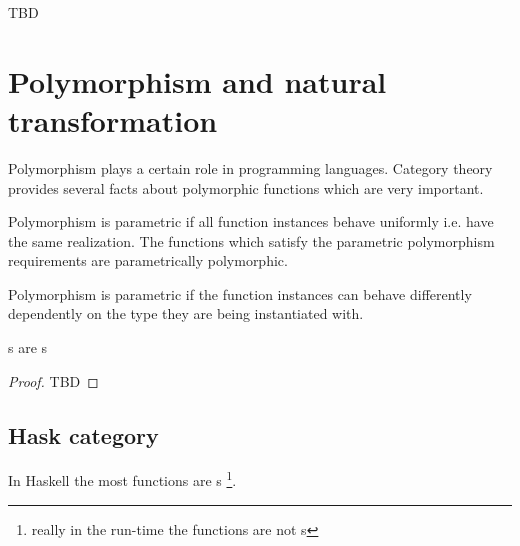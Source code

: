 TBD

\section{Polymorphism and natural transformation}

Polymorphism plays a certain role in programming languages. Category
theory provides several facts about polymorphic functions which are
very important.

\begin{definition}
\label{def:pp_function}
Polymorphism is parametric if all function instances behave uniformly
i.e. have the same realization. The functions which satisfy the
parametric polymorphism requirements are parametrically polymorphic.
\end{definition}

\begin{definition}
\label{def:ad_hoc_polymorphism}
Polymorphism is parametric if the function instances can behave
differently dependently on the type they are being instantiated with. 
\end{definition}

\begin{theorem}[Reynolds]
\label{thm:reynolds}
s are s 
\begin{proof}
TBD
\end{proof}
\end{theorem}

\subsection{\textbf{Hask} category}

In Haskell the most functions are s 
\footnote{really in the run-time the functions are not
  s}.  

